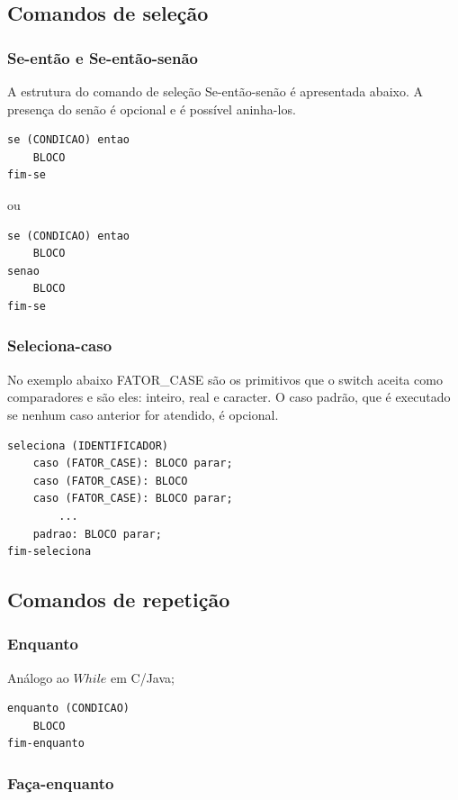 \documentclass[a4paper,12pt]{report}
\begin{document}
\subsection{Comandos de sele\c{c}\~ao}

\subsubsection{Se-ent\~ao e Se-ent\~ao-sen\~ao}

A estrutura do comando de sele\c{c}\~ao Se-ent\~ao-sen\~ao \'e apresentada abaixo.
A presen\c{c}a do sen\~ao \'e opcional e \'e poss\'ivel aninha-los.

\begin{verbatim}
se (CONDICAO) entao 
	BLOCO
fim-se
\end{verbatim}
ou
\begin{verbatim}
se (CONDICAO) entao 
	BLOCO
senao
	BLOCO
fim-se
\end{verbatim}

\subsubsection{Seleciona-caso}

No exemplo abaixo FATOR\_CASE s\~ao os primitivos que o switch aceita como comparadores e s\~ao eles:
inteiro, real e caracter.
O caso padr\~ao, que \'e executado se nenhum caso anterior for atendido, \'e opcional.

\begin{verbatim}
seleciona (IDENTIFICADOR)
	caso (FATOR_CASE): BLOCO parar;
    caso (FATOR_CASE): BLOCO
    caso (FATOR_CASE): BLOCO parar;
    	...
    padrao: BLOCO parar;
fim-seleciona
\end{verbatim}

\subsection{Comandos de repeti\c{c}\~ao}

\subsubsection{Enquanto}

An\'alogo ao $While$ em C/Java;

\begin{verbatim}
enquanto (CONDICAO)
	BLOCO
fim-enquanto
\end{verbatim}

\subsubsection{Fa\c{c}a-enquanto}
\end{document}
